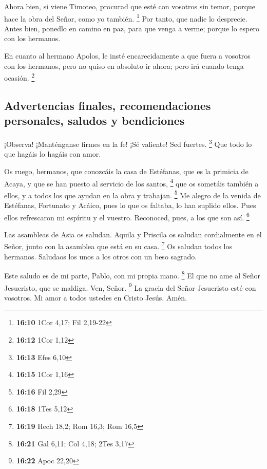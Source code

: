 Ahora bien, si viene Timoteo, procurad que esté con
vosotros sin temor, porque hace la obra del Señor, como yo también.
\footnote{\textbf{16:10} 1Cor 4,17; Fil 2,19-22}  Por
tanto, que nadie lo desprecie. Antes bien, ponedlo en camino en paz,
para que venga a verme; porque lo espero con los hermanos.

 En cuanto al hermano Apolos, le insté encarecidamente a
que fuera a vosotros con los hermanos, pero no quiso en absoluto ir
ahora; pero irá cuando tenga ocasión. \footnote{\textbf{16:12} 1Cor 1,12}

\hypertarget{advertencias-finales-recomendaciones-personales-saludos-y-bendiciones}{%
\subsection{Advertencias finales, recomendaciones personales, saludos y
bendiciones}\label{advertencias-finales-recomendaciones-personales-saludos-y-bendiciones}}

 ¡Observa! ¡Manténganse firmes en la fe! ¡Sé valiente!
Sed fuertes. \footnote{\textbf{16:13} Efes 6,10}  Que
todo lo que hagáis lo hagáis con amor.

 Os ruego, hermanos, que conozcáis la casa de Estéfanas,
que es la primicia de Acaya, y que se han puesto al servicio de los
santos, \footnote{\textbf{16:15} 1Cor 1,16}  que os
sometáis también a ellos, y a todos los que ayudan en la obra y
trabajan. \footnote{\textbf{16:16} Fil 2,29}  Me alegro
de la venida de Estéfanas, Fortunato y Acáico, pues lo que os faltaba,
lo han suplido ellos.  Pues ellos refrescaron mi espíritu
y el vuestro. Reconoced, pues, a los que son así. \footnote{\textbf{16:18}
  1Tes 5,12}

 Las asambleas de Asia os saludan. Aquila y Priscila os
saludan cordialmente en el Señor, junto con la asamblea que está en su
casa. \footnote{\textbf{16:19} Hech 18,2; Rom 16,3; Rom 16,5}
 Os saludan todos los hermanos. Saludaos los unos a los
otros con un beso sagrado.

 Este saludo es de mi parte, Pablo, con mi propia mano.
\footnote{\textbf{16:21} Gal 6,11; Col 4,18; 2Tes 3,17} 
El que no ame al Señor Jesucristo, que se maldiga. Ven, Señor.
\footnote{\textbf{16:22} Apoc 22,20}  La gracia del Señor
Jesucristo esté con vosotros.  Mi amor a todos ustedes en
Cristo Jesús. Amén.
